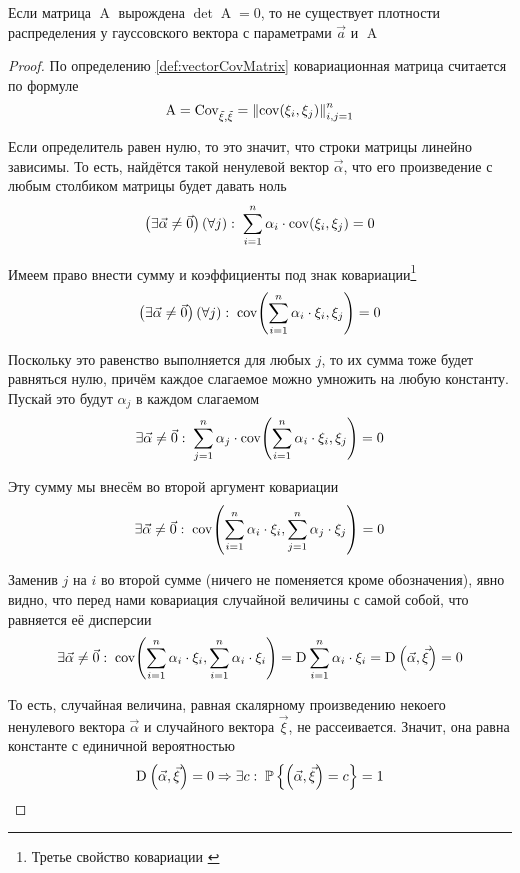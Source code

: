 \begin{affirmation}
    Если матрица $\operatorname{A}$ вырождена $\det\operatorname{A} = 0$, то не
    существует плотности распределения у гауссовского вектора с параметрами
    $\vec{a}$ и $\operatorname{A}$
\end{affirmation}
\begin{proof}
    По определению \ref{def:vectorCovMatrix} ковариационная матрица считается по
    формуле
    $$\operatorname{A}
        = \operatorname{Cov^{}_{\vec{\xi}, \vec{\xi}}}
        = \left\| \operatorname{cov}\!\left( \xi_i, \xi_j \right) \right\|_{i,j=1}^n$$

    Если определитель равен нулю, то это значит, что строки матрицы линейно
    зависимы. То есть, найдётся такой ненулевой вектор $\vec{\alpha}$, что
    его произведение с любым столбиком матрицы будет давать ноль
    $$\left( \exists \vec{\alpha} \neq \vec{0} \right) \left( \forall j \right):
        \;\sum_{i=1}^{n} \alpha_i \cdot \operatorname{cov}\!\left( \xi_i, \xi_j \right) = 0$$

    Имеем право внести сумму и коэффициенты под знак ковариации\footnote{Третье
    свойство ковариации \cite[с.~310]{MGTUXVI}}
    $$\left( \exists \vec{\alpha} \neq \vec{0} \right) \left( \forall j \right):
        \;\operatorname{cov}\!\left( \sum_{i=1}^{n} \alpha_i \cdot \xi_i, \xi_j \right) = 0$$

    Поскольку это равенство выполняется для любых $j$, то их сумма тоже будет
    равняться нулю, причём каждое слагаемое можно умножить на любую константу.
    Пускай это будут $\alpha_j$ в каждом слагаемом
    $$\exists \vec{\alpha} \neq \vec{0}:\; \sum_{j=1}^{n} \alpha_j
            \cdot \operatorname{cov}\!\left( \sum_{i=1}^{n} \alpha_i \cdot \xi_i, \xi_j \right) = 0$$

    Эту сумму мы внесём во второй аргумент ковариации
    $$\exists \vec{\alpha} \neq \vec{0}:\;
        \operatorname{cov}\!\left( \sum_{i=1}^{n} \alpha_i \cdot \xi_i,
            \sum_{j=1}^{n} \alpha_j \cdot \xi_j \right) = 0$$

    Заменив $j$ на $i$ во второй сумме (ничего не поменяется кроме обозначения),
    явно видно, что перед нами ковариация случайной величины с самой собой, что
    равняется её дисперсии
    $$\exists \vec{\alpha} \neq \vec{0}:\;
        \operatorname{cov}\!\left( \sum_{i=1}^{n} \alpha_i \cdot \xi_i,
            \sum_{i=1}^{n} \alpha_i \cdot \xi_i \right)
        = \operatorname{D}_{} \sum_{i=1}^{n} \alpha_i \cdot \xi_i
        = \operatorname{D}_{} \left( \vec{\alpha}, \vec{\xi} \right)
        = 0$$

    То есть, случайная величина, равная скалярному произведению некоего
    ненулевого вектора $\vec{\alpha}$ и случайного вектора $\vec{\xi}$,
    не рассеивается. Значит, она равна константе с единичной вероятностью
    $$\operatorname{D}_{} \left( \vec{\alpha}, \vec{\xi} \right) = 0
        \Rightarrow \exists c:\;
        \mathbb{P}\left\{ \left( \vec{\alpha}, \vec{\xi} \right) = c \right\} = 1$$


\end{proof}
